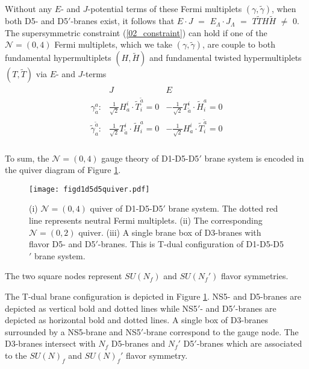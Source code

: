 \documentclass{article}
\numberwithin{equation}{section}
\begin{document}
Without any $E$- and $J$-potential terms 
of these Fermi multiplets $(\gamma,\widetilde{\gamma})$, 
when both D5- and D5$'$-branes exist, it follows that 
$E\cdot J$ $=$ $E_{\Lambda}\cdot J_{\Lambda}$ 
$=$ $T\widetilde{T}H\widetilde{H}$ $\neq$ $0$. 
The supersymmetric constraint (\ref{02_constraint}) can hold 
if one of the $\mathcal{N}=(0,4)$ Fermi multiplets, which we take $(\gamma,\widetilde{\gamma})$, 
are couple to both fundamental hypermultiplets $(H,\widetilde{H})$ 
and fundamental twisted hypermultiplets $(T,\widetilde{T})$ via $E$- and $J$-terms 
\begin{align}
\label{je_d5d5'}
\begin{array}{lcc}
&J&E \\
\gamma^{a}_{\tilde{a}}:&
\frac{1}{\sqrt{2}}H^{i}_{a}\cdot \widetilde{T}_{i}^{\tilde{a}}=0&
-\frac{1}{\sqrt{2}}T^{i}_{\tilde{a}}\cdot \widetilde{H}_{i}^{a}=0\\
\widetilde{\gamma}_{a}^{\tilde{a}}:&
\frac{1}{\sqrt{2}}T^{i}_{\tilde{a}}\cdot \widetilde{H}_{i}^{a}=0&
-\frac{1}{\sqrt{2}}H_{a}^{i}\cdot \widetilde{T}_{i}^{\tilde{a}}=0\\
\end{array}
\end{align}







To sum, the $\mathcal{N}=(0,4)$ gauge theory of D1-D5-D5$'$ brane system is encoded 
in the quiver diagram of Figure \ref{figd1d5d5quiver}.  
\begin{figure}
\begin{center}
\texttt{[image: figd1d5d5quiver.pdf]}
\caption{(i) $\mathcal{N}=(0,4)$ quiver of D1-D5-D5$'$ brane system. 
The dotted red line represents neutral Fermi multiplets. 
(ii) The corresponding $\mathcal{N}=(0,2)$ quiver. 
(iii) A single brane box of D3-branes with flavor D5- and D5$'$-branes. 
This is T-dual configuration of D1-D5-D5$'$ brane system. 
}
\label{figd1d5d5quiver}
\end{center}
\end{figure}
The two square nodes represent $SU(N_{f})$ and $SU(N_{f}')$ flavor symmetries. 


The T-dual brane configuration is depicted in Figure \ref{figd1d5d5quiver}. 
NS5- and D5-branes are depicted as vertical bold and dotted lines 
while NS5$'$- and D5$'$-branes are depicted as horizontal bold and dotted lines. 
A single box of D3-branes surrounded by a NS5-brane and NS5$'$-brane correspond to the gauge node. 
The D3-branes intersect with $N_{f}$ D5-branes and $N_{f}'$ D5$'$-branes which 
are associated to the $SU(N)_{f}$ and $SU(N)_{f}'$ flavor symmetry. 
\end{document}
